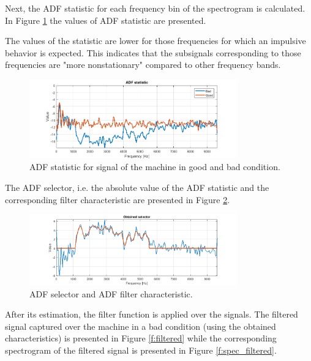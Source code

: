\documentclass[11pt]{article}
\begin{document}
Next, the ADF statistic for each frequency bin of the spectrogram is calculated. In Figure \ref{f:stats} the values of ADF statistic are presented. 

The values of the statistic are lower for those frequencies for which an impulsive behavior is expected. This indicates that the subsignals corresponding to those frequencies are "more nonstationary" compared to other frequency bands.

\begin{figure}[!ht]
\begin{center}
\includegraphics[width=0.8\textwidth]{lozysko_stats1_2.png}
\caption{ADF statistic for signal of the machine in good and bad condition. \label{f:stats}}
\end{center}
\end{figure}

The ADF selector, i.e. the absolute value of the ADF statistic and the corresponding filter characteristic are presented in Figure \ref{f:selector}.

\begin{figure}[!ht]
\begin{center}
\includegraphics[width=0.8\textwidth]{selector_3.png}
\caption{ADF selector and ADF filter characteristic.\label{f:selector}}
\end{center}
\end{figure}

After its estimation, the filter function is applied over the signals. The filtered signal captured over the machine in a bad condition (using the obtained characteristics) is presented in Figure \ref{f:filtered} while the corresponding spectrogram of the filtered signal is presented in Figure \ref{f:spec_filtered}.
\end{document}
